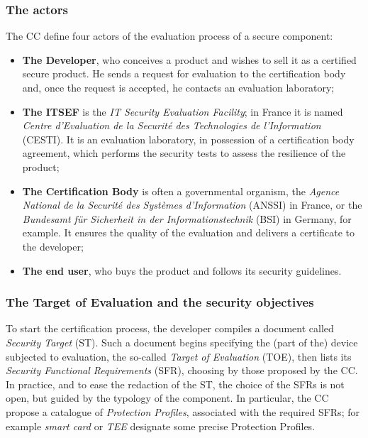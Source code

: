 \subsubsection{The actors} The CC define four actors of the evaluation process of a secure component:
\begin{itemize}
\item \textbf{The Developer}, who conceives a product and wishes to sell it as a certified secure product. He sends a request for evaluation to the certification body and, once the request is accepted, he contacts an evaluation laboratory;
\item \textbf{The ITSEF} is the \emph{IT Security Evaluation Facility}; in France it is named \emph{Centre d'Evaluation de la Securit\'e des Technologies de l'Information} (CESTI). It is an evaluation laboratory, in possession of a certification body agreement, which performs the security tests to assess the resilience of the product;
\item \textbf{The Certification Body} is often a governmental organism, the \emph{Agence National de la Securit\'e des Syst\`emes d'Information} (ANSSI) in France, or the \emph{Bundesamt f\"ur Sicherheit in der Informationstechnik} (BSI) in Germany, for example. It ensures the quality of the evaluation and delivers a certificate to the developer;
\item \textbf{The end user}, who buys the product and follows its security guidelines.
\end{itemize} 

\subsubsection{The Target of Evaluation and the security objectives} 
To start the certification process, the developer compiles a document called \emph{Security Target} (ST). Such a document begins specifying the (part of the) device subjected to evaluation, the so-called \emph{Target of Evaluation} (TOE), then lists its \emph{Security Functional Requirements} (SFR), choosing by those proposed by the CC. In practice, and to ease the redaction of the ST, the choice of the SFRs is not open, but guided by the typology of the component. In particular, the CC propose a catalogue of \emph{Protection Profiles}, associated with the required SFRs; for example \emph{smart card} or \emph{TEE} designate some precise Protection Profiles. 

